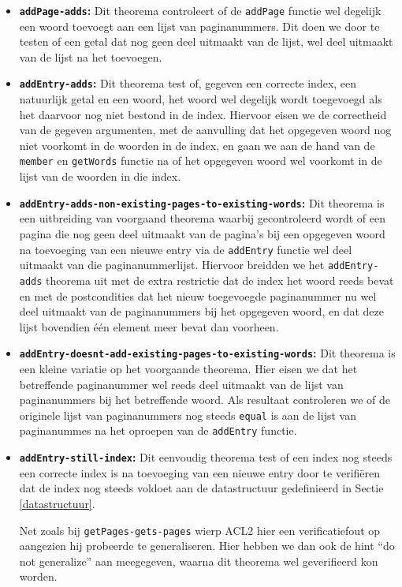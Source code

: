 \begin{itemize}
\item \textbf{\texttt{addPage-adds}:} Dit theorema controleert of de \texttt{addPage} functie wel degelijk een woord toevoegt aan een lijst van paginanummers. Dit doen we door te testen of een getal dat nog geen 
deel uitmaakt van de lijst, wel deel uitmaakt van de lijst na het toevoegen.

\item \textbf{\texttt{addEntry-adds}:} Dit theorema test of, gegeven een correcte index, een natuurlijk getal en een woord, het woord wel degelijk wordt toegevoegd als het daarvoor nog niet bestond in de index. Hiervoor eisen we de correctheid van de gegeven argumenten, met de aanvulling dat het opgegeven woord nog niet voorkomt in de woorden in de index, en gaan we aan de hand van de \texttt{member} en \texttt{getWords} functie na of het opgegeven woord wel voorkomt in de lijst van de woorden in die index.

\item \textbf{\texttt{addEntry-adds-non-existing-pages-to-existing-words}:} Dit theorema is een uitbreiding van voorgaand theorema waarbij gecontroleerd wordt of een pagina die nog geen deel uitmaakt van de pagina's bij een opgegeven woord na toevoeging van een nieuwe entry via de \texttt{addEntry} functie wel deel uitmaakt van die paginanummerlijst. Hiervoor breidden we het \texttt{addEntry-adds} theorema uit met de extra restrictie dat de index het woord reeds bevat en met de postcondities dat het nieuw toegevoegde paginanummer nu wel deel uitmaakt van de paginanummers bij het opgegeven woord, en dat deze lijst bovendien één element meer bevat dan voorheen.

\item \textbf{\texttt{addEntry-doesnt-add-existing-pages-to-existing-words}:} Dit theorema is een kleine variatie op het voorgaande theorema. Hier eisen we dat het betreffende paginanummer wel reeds deel uitmaakt van de lijst van paginanummers bij het betreffende woord. Als resultaat controleren we of de originele lijst van paginanummers nog steeds \texttt{equal} is aan de lijst van paginanummes na het oproepen van de \texttt{addEntry} functie.

\item \textbf{\texttt{addEntry-still-index}:} Dit eenvoudig theorema test of een index nog steeds een correcte index is na toevoeging van een nieuwe entry door te verifiëren dat de index nog steeds voldoet aan de datastructuur gedefinieerd in Sectie \ref{datastructuur}.

Net zoals bij \texttt{getPages-gets-pages} wierp ACL2 hier een verificatiefout op aangezien hij probeerde te generaliseren. Hier hebben we dan ook de hint ``do not generalize'' aan meegegeven, waarna dit theorema wel geverifieerd kon worden.
\end{itemize} 

